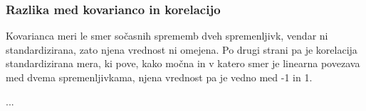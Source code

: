\subsubsection*{Razlika med kovarianco in korelacijo}
Kovarianca meri le smer sočasnih sprememb dveh spremenljivk, vendar ni standardizirana, zato njena vrednost ni omejena. Po drugi strani pa je korelacija standardizirana mera, ki pove, kako močna in v katero smer je linearna povezava med dvema spremenljivkama, njena vrednost pa je vedno med -1 in 1.


\begin{Vaje}{1}
    ...
\end{Vaje}